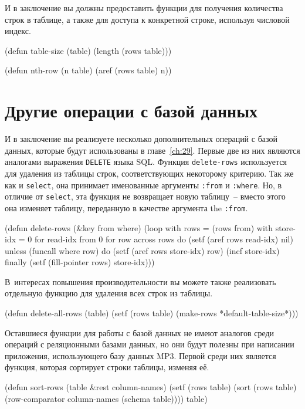 И в заключение вы должны предоставить функции для получения количества строк в таблице, а
также для доступа к конкретной строке, используя числовой индекс.

\begin{myverb}
(defun table-size (table)
  (length (rows table)))

(defun nth-row (n table)
  (aref (rows table) n))
\end{myverb}

\section{Другие операции с базой данных}

И в заключение вы реализуете несколько дополнительных операций с базой данных, которые
будут использованы в главе~\ref{ch:29}.  Первые две из них являются аналогами выражения
\lstinline{DELETE} языка SQL.  Функция \lstinline{delete-rows} используется для удаления из таблицы
строк, соответствующих некоторому критерию.  Так же как и \lstinline{select}, она принимает
именованные аргументы \lstinline{:from} и \lstinline{:where}.  Но, в отличие от \lstinline{select}, эта
функция не возвращает новую таблицу~-- вместо этого она изменяет таблицу, переданную в
качестве аргумента the \lstinline{:from}.

\begin{myverb}
(defun delete-rows (&key from where)
  (loop
     with rows = (rows from)
     with store-idx = 0
     for read-idx from 0
     for row across rows
     do (setf (aref rows read-idx) nil)
     unless (funcall where row) do
       (setf (aref rows store-idx) row)
       (incf store-idx)
     finally (setf (fill-pointer rows) store-idx)))
\end{myverb}

В~интересах повышения производительности вы можете также реализовать отдельную функцию
для удаления всех строк из таблицы.

\begin{myverb}
(defun delete-all-rows (table)
  (setf (rows table) (make-rows *default-table-size*)))
\end{myverb}

Оставшиеся функции для работы с базой данных не имеют аналогов среди операций с
реляционными базами данных, но они будут полезны при написании приложения, использующего
базу данных MP3.  Первой среди них является функция, которая сортирует строки таблицы,
изменяя её.

\begin{myverb}
(defun sort-rows (table &rest column-names)
  (setf (rows table) (sort (rows table) (row-comparator column-names (schema table))))
  table)
\end{myverb}


